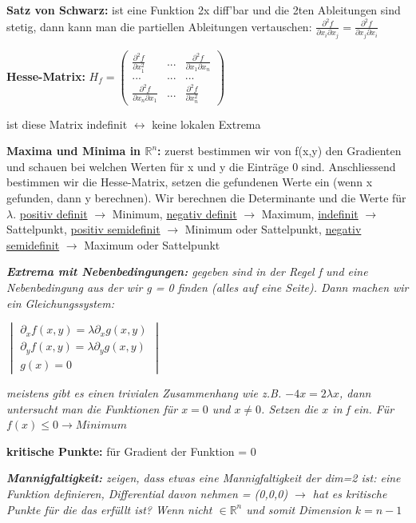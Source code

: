 \documentclass[a3paper, ngerman, 8pt]{article}
\begin{document}
\begin{multicols*}{3}
\textbf{Satz von Schwarz:} ist eine Funktion 2x diff'bar und die 2ten Ableitungen sind stetig, dann kann man die partiellen Ableitungen vertauschen: $\frac{\partial ^2 f}{\partial x_i \partial x_j}= \frac{\partial ^2 f}{\partial x_j \partial x_i}$

\textbf{Hesse-Matrix:} $H_f=\begin{pmatrix}
\frac{\partial ^2 f}{\partial x_1^2} & ... &\frac{\partial ^2 f}{\partial x_1 \partial x_n} \\
...& ... & ... \\
\frac{\partial ^2 f}{\partial x_n \partial x_1} & ... & \frac{\partial ^2 f}{\partial x_n^2}
\end{pmatrix}$ 

ist diese Matrix indefinit $\leftrightarrow$ keine lokalen Extrema

\textbf{Maxima und Minima in $\mathbb{R}^n$:} zuerst bestimmen wir von f(x,y) 
den Gradienten und schauen bei welchen Werten für x und y die Einträge 0 sind. 
Anschliessend bestimmen wir die Hesse-Matrix, setzen die gefundenen Werte ein 
(wenn x gefunden, dann y berechnen). Wir berechnen die Determinante und die 
Werte für $\lambda$. \underline{positiv definit} $\to$ Minimum, 
\underline{negativ definit} $\to$ Maximum, \underline{indefinit} $\to$ 
Sattelpunkt, \underline{positiv semidefinit} $\to$ Minimum oder  Sattelpunkt, 
\underline{negativ semidefinit} $\to$ Maximum oder  Sattelpunkt

\textit{\textbf{Extrema mit Nebenbedingungen:} gegeben sind in der Regel f und
eine Nebenbedingung aus der wir g = 0 finden (alles auf eine Seite). Dann machen wir ein Gleichungssystem:}

$\begin{vmatrix}
\partial_xf(x,y) = \lambda \partial_x g(x,y) \\
\partial_yf(x,y) = \lambda \partial_y g(x,y)\\
g(x)=0
\end{vmatrix}$

\textit{meistens gibt es einen trivialen Zusammenhang wie z.B. $-4x=2\lambda x$, dann untersucht man die Funktionen für $x=0$ und $x\neq 0$. Setzen die $x$ in f ein. Für $f(x)\leq 0 \to Minimum$}

\textbf{kritische Punkte:} für Gradient der Funktion = $0$

\textit{\textbf{Mannigfaltigkeit:} zeigen, dass etwas eine Mannigfaltigkeit der 
dim=2 ist: eine Funktion definieren, Differential davon nehmen = (0,0,0) $\to$ 
hat es kritische Punkte für die das erfüllt ist? Wenn nicht $\in \mathbb{R}^n$ und somit Dimension $k=n-1$}


\end{multicols*}
\end{document}
